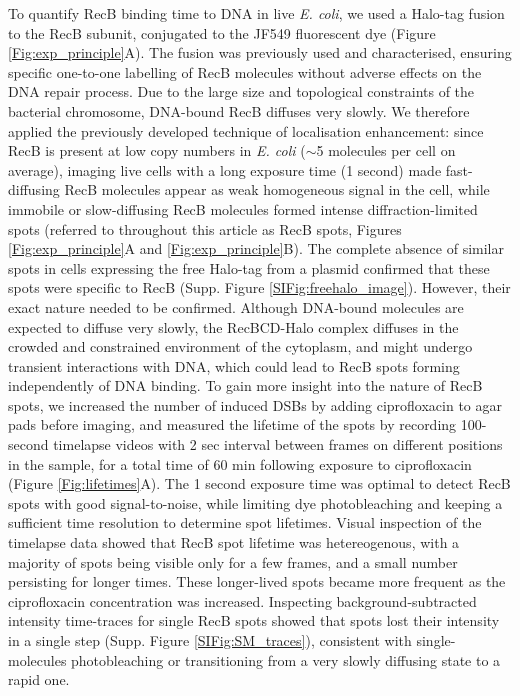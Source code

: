 To quantify RecB binding time to DNA in live \textit{E. coli}, we used a Halo-tag fusion to the RecB subunit, conjugated to the JF549 fluorescent dye (Figure \ref{Fig:exp_principle}A). The fusion was previously used and characterised, ensuring specific one-to-one labelling of RecB molecules without adverse effects on the DNA repair process\cite{Lepore2019a,Lepore2023}. Due to the large size and topological constraints of the bacterial chromosome, DNA-bound RecB diffuses very slowly\cite{Lepore2023}. We therefore applied the previously developed technique of localisation enhancement\cite{Yu2006, Elf2007}: since RecB is present at low copy numbers in \textit{E. coli} ($\sim$5 molecules per cell on average\cite{Lepore2019a}), imaging live cells with a long exposure time (1 second) made fast-diffusing RecB molecules appear as weak homogeneous signal in the cell, while immobile or slow-diffusing RecB molecules formed intense diffraction-limited spots (referred to throughout this article as RecB spots, Figures \ref{Fig:exp_principle}A and \ref{Fig:exp_principle}B). The complete absence of similar spots in cells expressing the free Halo-tag from a plasmid confirmed that these spots were specific to RecB (Supp. Figure \ref{SIFig:freehalo_image}). However, their exact nature needed to be confirmed. Although DNA-bound molecules are expected to diffuse very slowly, the RecBCD-Halo complex diffuses in the crowded and constrained environment of the cytoplasm, and might undergo transient interactions with DNA\cite{Lepore2023}, which could lead to RecB spots forming independently of DNA binding. To gain more insight into the nature of RecB spots, we increased the number of induced DSBs by adding ciprofloxacin to agar pads before imaging, and measured the lifetime of the spots by recording 100-second timelapse videos with 2 sec interval between frames on different positions in the sample, for a total time of 60 min following exposure to ciprofloxacin (Figure \ref{Fig:lifetimes}A). The 1 second exposure time was optimal to detect RecB spots with good signal-to-noise, while limiting dye photobleaching and keeping a sufficient time resolution to determine spot lifetimes. Visual inspection of the timelapse data showed that RecB spot lifetime was hetereogenous, with a majority of spots being visible only for a few frames, and a small number persisting for longer times. These longer-lived spots became more frequent as the ciprofloxacin concentration was increased. Inspecting background-subtracted intensity time-traces for single RecB spots showed that spots lost their intensity in a single step (Supp. Figure \ref{SIFig:SM_traces}), consistent with single-molecules photobleaching or transitioning from a very slowly diffusing state to a rapid one.

